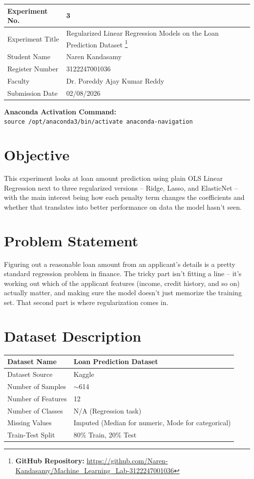 \documentclass[12pt,a4paper]{article}
\begin{document}
\begin{tabular}{|p{4cm}|p{11cm}|}
\hline
Experiment No. & 3 \\ \hline
Experiment Title & Regularized Linear Regression Models on the Loan Prediction Dataset
\footnote{\textbf{GitHub Repository: }\url{https://github.com/Naren-Kandasamy/Machine_Learning_Lab-3122247001036}}\\ \hline
Student Name & Naren Kandasamy \\ \hline
Register Number & 3122247001036 \\ \hline
Faculty & Dr. Poreddy Ajay Kumar Reddy \\ \hline
Submission Date & 02/08/2026 \\ \hline
\end{tabular}

\vspace{0.5cm}
\noindent\textbf{Anaconda Activation Command:} \\
\texttt{source /opt/anaconda3/bin/activate anaconda-navigation}

\section{Objective}
This experiment looks at loan amount prediction using plain OLS Linear Regression next to three regularized versions -- Ridge, Lasso, and ElasticNet -- with the main interest being how each penalty term changes the coefficients and whether that translates into better performance on data the model hasn't seen.

\section{Problem Statement}
Figuring out a reasonable loan amount from an applicant's details is a pretty standard regression problem in finance. The tricky part isn't fitting a line -- it's working out which of the applicant features (income, credit history, and so on) actually matter, and making sure the model doesn't just memorize the training set. That second part is where regularization comes in.

\section{Dataset Description}
\begin{longtable}{|p{6cm}|p{8cm}|}
\hline
Dataset Name & Loan Prediction Dataset \\ \hline
Dataset Source & Kaggle \\ \hline
Number of Samples & $\sim$614 \\ \hline
Number of Features & 12 \\ \hline
Number of Classes & N/A (Regression task) \\ \hline
Missing Values & Imputed (Median for numeric, Mode for categorical) \\ \hline
Train-Test Split & 80\% Train, 20\% Test \\ \hline
\end{longtable}
\end{document}
